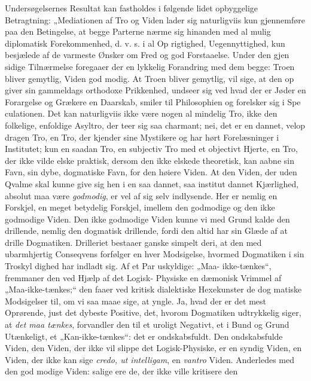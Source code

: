 \documentclass[12pt]{book}
\newcommand{\opage}[1]{\marginnote{\footnotesize\textit{[#1]}}}
\begin{document}
Undersøgelsernes Resultat kan fastholdes i følgende
lidet opbyggelige Betragtning: „Mediationen af Tro og
Viden lader sig naturligviis kun gjennemføre paa den
\opage{243}\setcounter{footnote}{0}%
Betingelse, at begge Parterne nærme sig hinanden med
al mulig diplomatisk Forekommenhed, d. v. s. i al Op\-%
rigtighed, Uegennyttighed, kun besjælede af de varmeste
Ønsker om Fred og god Forstaaelse. Under den gjen\-%
sidige Tilnærmelse foregaaer der en lykkelig Forandring
med dem begge: Troen bliver gemytlig, Viden god\-%
modig. At Troen bliver gemytlig, vil sige, at den op\-%
giver sin gammeldags orthodoxe Prikkenhed, undseer
sig ved hvad der er Jøder en Forargelse og Grækere en
Daarskab, smiler til Philosophien og forelsker sig i Spe\-%
culationen. Det kan naturligviis ikke være nogen al\-%
mindelig Tro, ikke den folkelige, enfoldige Asyltro, der
teer sig saa charmant; nei, det er en dannet, velop\-%
dragen Tro, en Tro, der kjender sine Mystikere og har
hørt Forelæsninger i Institutet; kun en saadan Tro, en
subjectiv Tro med et objectivt Hjerte, en Tro, der ikke
vilde elske praktisk, dersom den ikke elskede theoretisk,
kan aabne sin Favn, sin dybe, dogmatiske Favn, for
den høiere Viden. At den Viden, der uden Qvalme
skal kunne give sig hen i en saa dannet, saa institut\-%
dannet Kjærlighed, absolut maa være \emph{godmodig}, er vel
af sig selv indlysende. Her er nemlig en Forskjel, en
meget betydelig Forskjel, imellem den godmodige og
den ikke godmodige Viden. Den ikke godmodige Viden
kunne vi med Grund kalde den drillende, nemlig den
dogmatisk drillende, fordi den altid har sin Glæde af at
drille Dogmatiken. Drilleriet bestaaer ganske simpelt
deri, at den med ubarmhjertig Conseqvens forfølger en\-%
hver Modsigelse, hvormed Dogmatiken i sin Troskyl\-%
dighed har indladt sig. Af et Par uskyldige: „Maa-%
ikke-tænkes“, fremmaner den ved Hjælp af det Logisk-%
Physiske en dæmonisk Vrimmel af „Maa-ikke-tænkes;“
den faaer ved kritisk dialektiske Hexekunster de dog\-%
matiske Modsigelser til, om vi saa maae sige, at yngle.
\opage{244}\setcounter{footnote}{0}%
Ja, hvad der er det mest Oprørende, just det dybeste
Positive, det, hvorom Dogmatiken udtrykkelig siger, at
\emph{det maa tænkes}, forvandler den til et uroligt Negativt,
et i Bund og Grund Utænkeligt, et „Kan-ikke-tænkes“:
det er ondskabsfuldt. Den ondskabsfulde Viden, den
Viden, der ikke vil slippe det Logisk-Physiske, er en
syndig Viden, en Viden, der ikke kan sige \textit{credo, ut
intelligam}, en \emph{vantro} Viden. Anderledes med den god\-%
modige Viden: salige ere de, der ikke ville kritisere den
\end{document}
